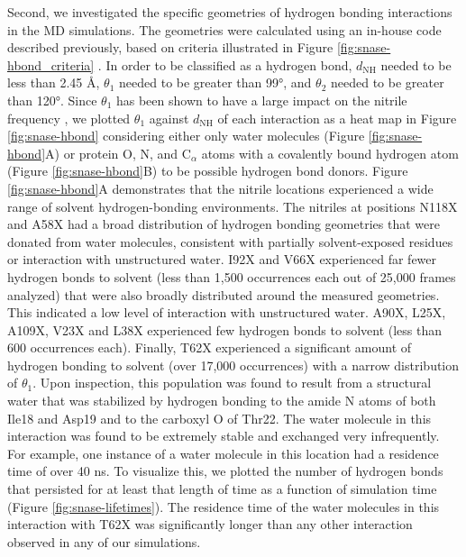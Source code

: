 Second, we investigated the specific geometries of hydrogen bonding interactions in the MD simulations. 
The geometries were calculated using an in-house code described previously, based on criteria illustrated in Figure \ref{fig:snase-hbond_criteria} \cite{First2018}.
In order to be classified as a hydrogen bond, $d_\text{NH}$ needed to be less than 2.45 \si{\angstrom}, $\theta_1$ needed to be greater than \ang{99}, and $\theta_2$ needed to be greater than \ang{120}. 
Since $\theta_1$ has been shown to have a large impact on the nitrile frequency \cite{Choi2008, First2018}, we plotted $\theta_1$ against $d_\text{NH}$ of each interaction as a heat map in Figure \ref{fig:snase-hbond} considering either only water molecules (Figure \ref{fig:snase-hbond}A) or protein O, N, and C$_{\alpha}$ atoms with a covalently bound hydrogen atom (Figure \ref{fig:snase-hbond}B) to be possible hydrogen bond donors. 
Figure \ref{fig:snase-hbond}A demonstrates that the nitrile locations experienced a wide range of solvent hydrogen-bonding environments. 
The nitriles at positions N118X and A58X had a broad distribution of hydrogen bonding geometries that were donated from water molecules, consistent with partially solvent-exposed residues or interaction with unstructured water. 
I92X and V66X experienced far fewer hydrogen bonds to solvent (less than 1,500 occurrences each out of 25,000 frames analyzed) that were also broadly distributed around the measured geometries. 
This indicated a low level of interaction with unstructured water. A90X, L25X, A109X, V23X and L38X experienced few hydrogen bonds to solvent (less than 600 occurrences each). 
Finally, T62X experienced a significant amount of hydrogen bonding to solvent (over 17,000 occurrences) with a narrow distribution of $\theta_1$. 
Upon inspection, this population was found to result from a structural water that was stabilized by hydrogen bonding to the amide N atoms of both Ile18 and Asp19 and to the carboxyl O of Thr22. 
The water molecule in this interaction was found to be extremely stable and exchanged very infrequently. 
For example, one instance of a water molecule in this location had a residence time of over 40 ns. 
To visualize this, we plotted the number of hydrogen bonds that persisted for at least that length of time as a function of simulation time (Figure \ref{fig:snase-lifetimes}). 
The residence time of the water molecules in this interaction with T62X was significantly longer than any other interaction observed in any of our simulations.


